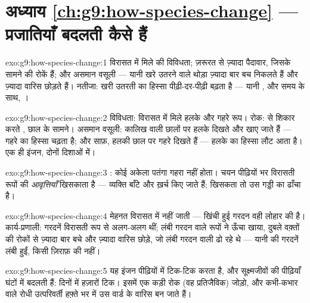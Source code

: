 \section*{अध्याय \ref{ch:g9:how-species-change} --- प्रजातियाँ बदलती कैसे हैं}

\begin{solution}{exo:g9:how-species-change:1}
विरासत में मिले  की विविधता; ज़रूरत से ज़्यादा पैदावार, जिसके
सामने  की रोकें हैं; और असमान वसूली --- यानी खरे उतरने वाले
थोड़ा ज़्यादा बार बच निकलते हैं और ज़्यादा वारिस छोड़ते हैं। नतीजा: खरी
उतरती  का हिस्सा पीढ़ी-दर-पीढ़ी बढ़ता है --- यानी ,
और समय के साथ, ।
\end{solution}

\begin{solution}{exo:g9:how-species-change:2}
विविधता: विरासत में मिले हलके और गहरे रूप। रोक:  से शिकार करते ,
छाल के सामने। असमान वसूली: कालिख वाली छालों पर हलके दिखते और खाए जाते हैं
--- गहरे का हिस्सा चढ़ता है; और साफ़, हलकी छाल पर गहरे दिखते हैं --- हलके
का हिस्सा लौट आता है। एक ही इंजन, दोनों दिशाओं में।
\end{solution}

\begin{solution}{exo:g9:how-species-change:3}
: कोई अकेला पतंगा गहरा नहीं होता। चयन पीढ़ियों भर विरासती रूपों की
\emph{आवृत्तियाँ} खिसकाता है --- व्यक्ति बाँटे और ख़र्च किए जाते हैं;
खिसकता तो उस गड्डी का ढाँचा है।
\end{solution}

\begin{solution}{exo:g9:how-species-change:4}
मेहनत विरासत में नहीं जाती --- खिंची हुई गरदन वही लोहार की  है।
कार्य-प्रणाली: गरदनें विरासती रूप से अलग-अलग थीं; लंबी गरदन वाले रूपों ने
ऊँचा खाया, दुबले वक़्तों की रोकों से ज़्यादा बार बचे और ज़्यादा वारिस
छोड़े, जो लंबी गरदन वाली  ढो रहे थे --- यानी  की गरदनें
लंबी हुईं, किसी ज़िराफ़ की नहीं।
\end{solution}

\begin{solution}{exo:g9:how-species-change:5}
यह इंजन पीढ़ियों में टिक-टिक करता है, और सूक्ष्मजीवों की पीढ़ियाँ घंटों
में बदलती हैं: दिनों में हज़ारों टिक। इसमें एक कड़ी रोक (वह प्रतिजैविक)
जोड़ो, और कभी-कभार वाले रोधी उत्परिवर्ती हफ़्ते भर में उस वार्ड के वारिस
बन जाते हैं।
\end{solution}

